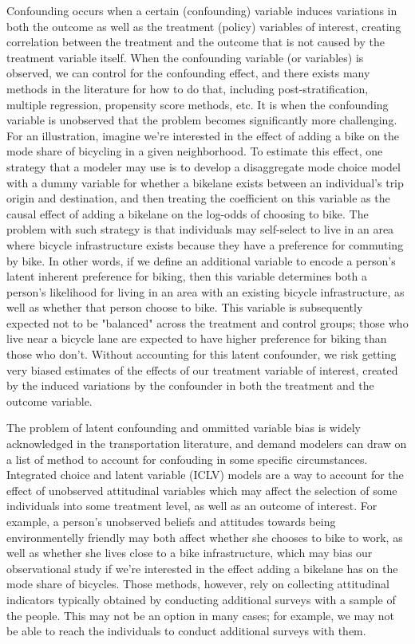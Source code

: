 Confounding occurs when a certain (confounding) variable induces variations in
both the outcome as well as the treatment (policy) variables of interest, 
creating correlation between the treatment and the outcome that is not caused
by the treatment variable itself. When the confounding variable (or variables) is 
observed, we can control for the confounding effect, and there exists many 
methods in the literature for how to do that, including post-stratification,
multiple regression, propensity score methods, etc. It is when the 
confounding variable is unobserved that the problem becomes significantly 
more challenging. 
For an illustration, imagine we're interested in the effect of adding a bike on the mode share of bicycling in a given neighborhood. 
To estimate this effect, one strategy that a modeler may use is to develop a disaggregate mode choice model with a dummy variable for whether a bikelane exists between an individual's trip origin and destination, and then treating the coefficient on this variable as the causal effect of adding a bikelane on the log-odds of choosing to bike. 
The problem with such strategy is that individuals may self-select to live in an area where bicycle infrastructure exists because they have a preference for commuting by bike. 
In other words, if we define an additional variable to encode a person's latent inherent preference for biking, then this variable determines both a person's likelihood for living in an area with an existing bicycle infrastructure, as well as whether that person choose to bike. 
This variable is subsequently expected not to be "balanced" across the treatment and control groups; those who live near a bicycle lane are expected to have higher preference for biking than those who don't. 
Without accounting for this latent confounder, we risk getting very biased estimates 
of the effects of our treatment variable of interest, created by the 
induced variations by the confounder in both the treatment and the outcome 
variable. 



The problem of latent confounding and ommitted variable bias is widely 
acknowledged in the transportation literature, and demand modelers can draw on 
a list of method to account for confouding in some specific circumstances. 
Integrated choice and latent variable (ICLV) models are a way to account for 
the effect of unobserved attitudinal variables which may affect the selection 
of some individuals into some treatment level, as well as an outcome of 
interest. For example, a person's unobserved beliefs and attitudes towards 
being environmentelly friendly may both affect whether she chooses to bike to 
work, as well as whether she lives close to a bike infrastructure, which may 
bias our observational study if we're interested in the effect adding a 
bikelane has on the mode share of bicycles. Those methods, however, rely on 
collecting attitudinal indicators typically obtained by conducting
additional surveys with a sample of the people. This may not be an option in 
many cases; for example, we may not be able to reach the individuals to conduct additional surveys with them. 


